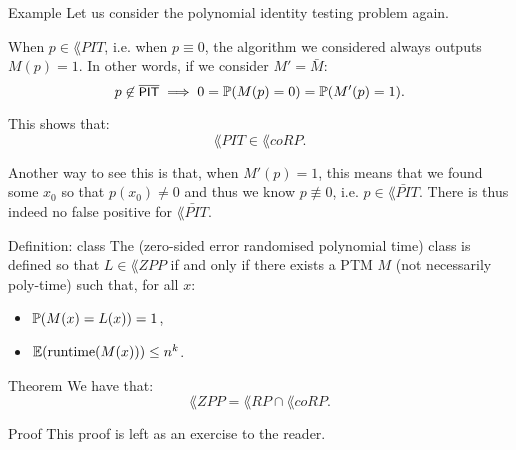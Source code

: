 \documentclass[a4paper]{article}
\begin{document}
\begin{parag}{Example}
    Let us consider the polynomial identity testing problem again.

    When $p \in \lang{PIT}$, i.e. when $p \equiv 0$, the algorithm we considered always outputs $M\left(p\right) = 1$. In other words, if we consider $M' = \bar{M}$: 
    \[p \not\in \bar{\lang{PIT}} \implies 0 = \prob\left(M\left(p\right) = 0\right) = \prob\left(M'\left(p\right) = 1\right).\]

    This shows that: 
    \[\lang{PIT} \in \lang{coRP}.\]

    Another way to see this is that, when $M'\left(p\right) = 1$, this means that we found some $x_0$ so that $p\left(x_0\right) \neq 0$ and thus we know $p \not\equiv 0$, i.e. $p \in \bar{\lang{PIT}}$. There is thus indeed no false positive for $\bar{\lang{PIT}}$.
\end{parag}

\begin{parag}{Definition:  class}
    The  (zero-sided error randomised polynomial time) class is defined so that $L \in \lang{ZPP}$ if and only if there exists a PTM $M$ (not necessarily poly-time) such that, for all $x$:
    \begin{itemize}
        \item $\prob\left(M\left(x\right) = L\left(x\right)\right) = 1$,
        \item $\exval\left(\text{runtime}\left(M\left(x\right)\right)\right) \leq n^k$.
    \end{itemize}
\end{parag}

\begin{parag}{Theorem}
    We have that:
    \[\lang{ZPP} = \lang{RP} \cap \lang{coRP}.\]

    \begin{subparag}{Proof}
        This proof is left as an exercise to the reader.
    \end{subparag}
\end{parag}
\end{document}
